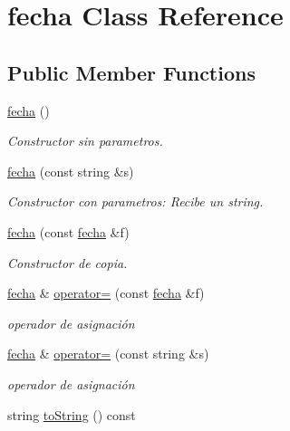 \hypertarget{classfecha}{}\section{fecha Class Reference}
\label{classfecha}
\subsection*{Public Member Functions}
\begin{DoxyCompactItemize}
\item 
\hyperlink{classfecha_a6775ef84b5838e12e28fd341793f4539}{fecha} ()
\begin{DoxyCompactList}\small\item\em Constructor sin parametros. \end{DoxyCompactList}\item 
\hyperlink{classfecha_aed5c22d5eeb15f1f2927d5a2c28b74df}{fecha} (const string \&s)
\begin{DoxyCompactList}\small\item\em Constructor con parametros\+: Recibe un string. \end{DoxyCompactList}\item 
\hyperlink{classfecha_a2cb762c17ba6ea6bcb6b0aabb919bef6}{fecha} (const \hyperlink{classfecha}{fecha} \&f)
\begin{DoxyCompactList}\small\item\em Constructor de copia. \end{DoxyCompactList}\item 
\hyperlink{classfecha}{fecha} \& \hyperlink{classfecha_aeb5a68104e936f98eb933b4d6856f841}{operator=} (const \hyperlink{classfecha}{fecha} \&f)
\begin{DoxyCompactList}\small\item\em operador de asignación \end{DoxyCompactList}\item 
\hyperlink{classfecha}{fecha} \& \hyperlink{classfecha_afff8905488f3d97ecfe6141f8521ac22}{operator=} (const string \&s)
\begin{DoxyCompactList}\small\item\em operador de asignación \end{DoxyCompactList}\item 
\hypertarget{classfecha_a26d22b980284408eac0da084f358c43b}{}string \hyperlink{classfecha_a26d22b980284408eac0da084f358c43b}{to\+String} () const \label{classfecha_a26d22b980284408eac0da084f358c43b}


\end{DoxyCompactItemize}
